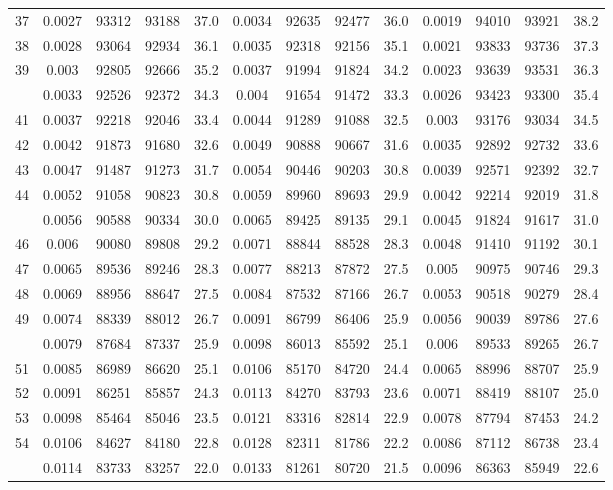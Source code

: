 \documentclass[
  14pt,
]{article}
\begin{document}
\begin{longtable}[t]{lcccccccccccc}
37 & 0.0027 & 93312 & 93188 & 37.0 & 0.0034 & 92635 & 92477 & 36.0 & 0.0019 & 94010 & 93921 & 38.2\\
38 & 0.0028 & 93064 & 92934 & 36.1 & 0.0035 & 92318 & 92156 & 35.1 & 0.0021 & 93833 & 93736 & 37.3\\
39 & 0.003 & 92805 & 92666 & 35.2 & 0.0037 & 91994 & 91824 & 34.2 & 0.0023 & 93639 & 93531 & 36.3\\
\addlinespace
40 & 0.0033 & 92526 & 92372 & 34.3 & 0.004 & 91654 & 91472 & 33.3 & 0.0026 & 93423 & 93300 & 35.4\\
41 & 0.0037 & 92218 & 92046 & 33.4 & 0.0044 & 91289 & 91088 & 32.5 & 0.003 & 93176 & 93034 & 34.5\\
42 & 0.0042 & 91873 & 91680 & 32.6 & 0.0049 & 90888 & 90667 & 31.6 & 0.0035 & 92892 & 92732 & 33.6\\
43 & 0.0047 & 91487 & 91273 & 31.7 & 0.0054 & 90446 & 90203 & 30.8 & 0.0039 & 92571 & 92392 & 32.7\\
44 & 0.0052 & 91058 & 90823 & 30.8 & 0.0059 & 89960 & 89693 & 29.9 & 0.0042 & 92214 & 92019 & 31.8\\
\addlinespace
45 & 0.0056 & 90588 & 90334 & 30.0 & 0.0065 & 89425 & 89135 & 29.1 & 0.0045 & 91824 & 91617 & 31.0\\
46 & 0.006 & 90080 & 89808 & 29.2 & 0.0071 & 88844 & 88528 & 28.3 & 0.0048 & 91410 & 91192 & 30.1\\
47 & 0.0065 & 89536 & 89246 & 28.3 & 0.0077 & 88213 & 87872 & 27.5 & 0.005 & 90975 & 90746 & 29.3\\
48 & 0.0069 & 88956 & 88647 & 27.5 & 0.0084 & 87532 & 87166 & 26.7 & 0.0053 & 90518 & 90279 & 28.4\\
49 & 0.0074 & 88339 & 88012 & 26.7 & 0.0091 & 86799 & 86406 & 25.9 & 0.0056 & 90039 & 89786 & 27.6\\
\addlinespace
50 & 0.0079 & 87684 & 87337 & 25.9 & 0.0098 & 86013 & 85592 & 25.1 & 0.006 & 89533 & 89265 & 26.7\\
51 & 0.0085 & 86989 & 86620 & 25.1 & 0.0106 & 85170 & 84720 & 24.4 & 0.0065 & 88996 & 88707 & 25.9\\
52 & 0.0091 & 86251 & 85857 & 24.3 & 0.0113 & 84270 & 83793 & 23.6 & 0.0071 & 88419 & 88107 & 25.0\\
53 & 0.0098 & 85464 & 85046 & 23.5 & 0.0121 & 83316 & 82814 & 22.9 & 0.0078 & 87794 & 87453 & 24.2\\
54 & 0.0106 & 84627 & 84180 & 22.8 & 0.0128 & 82311 & 81786 & 22.2 & 0.0086 & 87112 & 86738 & 23.4\\
\addlinespace
55 & 0.0114 & 83733 & 83257 & 22.0 & 0.0133 & 81261 & 80720 & 21.5 & 0.0096 & 86363 & 85949 & 22.6\\

\end{longtable}
\end{document}
